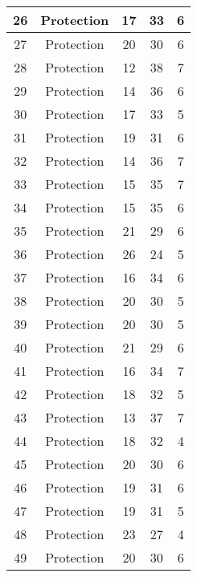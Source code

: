 \documentclass[results.tex]{subfiles}
\begin{document}
\begin{center}
\begin{tabular}{| c || c | c | c | c |}
    \hline
    26 & Protection & 17 & 33 & 6 \\ 
    \hline
    27 & Protection & 20 & 30 & 6 \\ 
    \hline
    28 & Protection & 12 & 38 & 7 \\ 
    \hline
    29 & Protection & 14 & 36 & 6 \\ 
    \hline
    30 & Protection & 17 & 33 & 5 \\ 
    \hline
    31 & Protection & 19 & 31 & 6 \\ 
    \hline
    32 & Protection & 14 & 36 & 7 \\ 
    \hline
    33 & Protection & 15 & 35 & 7 \\ 
    \hline
    34 & Protection & 15 & 35 & 6 \\ 
    \hline
    35 & Protection & 21 & 29 & 6 \\ 
    \hline
    36 & Protection & 26 & 24 & 5 \\ 
    \hline
    37 & Protection & 16 & 34 & 6 \\ 
    \hline
    38 & Protection & 20 & 30 & 5 \\ 
    \hline
    39 & Protection & 20 & 30 & 5 \\ 
    \hline
    40 & Protection & 21 & 29 & 6 \\ 
    \hline
    41 & Protection & 16 & 34 & 7 \\ 
    \hline
    42 & Protection & 18 & 32 & 5 \\ 
    \hline
    43 & Protection & 13 & 37 & 7 \\ 
    \hline
    44 & Protection & 18 & 32 & 4 \\ 
    \hline
    45 & Protection & 20 & 30 & 6 \\ 
    \hline
    46 & Protection & 19 & 31 & 6 \\ 
    \hline
    47 & Protection & 19 & 31 & 5 \\ 
    \hline
    48 & Protection & 23 & 27 & 4 \\ 
    \hline
    49 & Protection & 20 & 30 & 6 \\ 
    \hline   \end{tabular}
\end{center}
\end{document}

